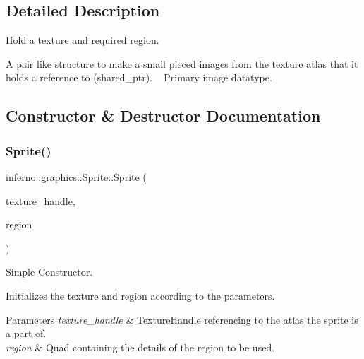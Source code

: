 \subsection{Detailed Description}
Hold a texture and required region. 

A pair like structure to make a small pieced images from the texture atlas that it holds a reference to (shared\+\_\+ptr). ~\newline
Primary image datatype. 

\subsection{Constructor \& Destructor Documentation}
\mbox{\label{classinferno_1_1graphics_1_1_sprite_a404b45a087a04018e5e2bc5c7b59ab67}} 
\subsubsection{\texorpdfstring{Sprite()}{Sprite()}\hspace{0.1cm}{\footnotesize\ttfamily [1/2]}}
{\footnotesize\ttfamily inferno\+::graphics\+::\+Sprite\+::\+Sprite (\begin{DoxyParamCaption}\item[{Texture\+Handle}]{texture\+\_\+handle,  }\item[{\mbox{\hyperlink{classinferno_1_1graphics_1_1_rectangle}{Quad}}}]{region }\end{DoxyParamCaption})\hspace{0.3cm}{\ttfamily [inline]}}



Simple Constructor. 

Initializes the texture and region according to the parameters. 
\begin{DoxyParams}{Parameters}
{\em texture\+\_\+handle} & Texture\+Handle referencing to the atlas the sprite is a part of. \\
\hline
{\em region} & Quad containing the details of the region to be used. \\
\hline
\end{DoxyParams}
\mbox{\label{classinferno_1_1graphics_1_1_sprite_a8673ad1ca45d867e83355a1ad10b752a}} 
